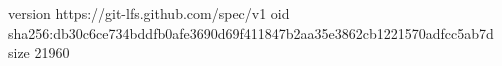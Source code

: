version https://git-lfs.github.com/spec/v1
oid sha256:db30c6ce734bddfb0afe3690d69f411847b2aa35e3862cb1221570adfcc5ab7d
size 21960
